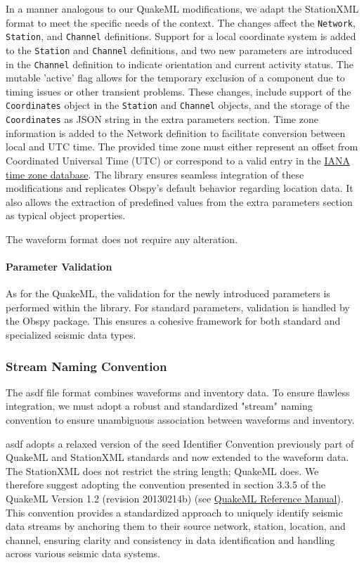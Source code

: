 In a manner analogous to our QuakeML modifications, we adapt the StationXML format to meet the specific needs of the \museismic context. The changes affect the \texttt{Network}, \texttt{Station}, and \texttt{Channel} definitions. Support for a local coordinate system is added to the \texttt{Station} and \texttt{Channel} definitions, and two new parameters are introduced in the \texttt{Channel} definition to indicate orientation and current activity status. The mutable 'active' flag allows for the temporary exclusion of a component due to timing issues or other transient problems. These changes, include support of the \texttt{Coordinates} object in the \texttt{Station} and \texttt{Channel} objects, and the storage of the \texttt{Coordinates} as JSON string in the extra parameters section. Time zone information is added to the Network definition to facilitate conversion between local and UTC time. The provided time zone must either represent an offset from Coordinated Universal Time (UTC) or correspond to a valid entry in the \href{https://www.iana.org/time-zones}{IANA time zone database}. The \muquake library ensures seamless integration of these modifications and replicates Obspy's default behavior regarding location data. It also allows the extraction of predefined values from the extra parameters section as typical object properties.

The waveform format does not require any alteration.

\paragraph{Parameter Validation}
As for the QuakeML, the validation for the newly introduced parameters is performed within the \muquake library. For standard parameters, validation is handled by the Obspy package. This ensures a cohesive framework for both standard and specialized seismic data types.

\subsubsection{Stream Naming Convention}

The \gls{asdf} file format combines waveforms and inventory data. To ensure flawless integration, we must adopt a robust and standardized "stream" naming convention to ensure unambiguous association between waveforms and inventory. 

\gls{asdf} adopts a relaxed version of the \gls{seed} Identifier Convention previously part of QuakeML and StationXML standards and now extended to the waveform data. The StationXML does not restrict the string length; QuakeML does. We therefore suggest adopting the convention presented in section 3.3.5 of the QuakeML Version 1.2 (revision 20130214b) (see \href{https://quake.ethz.ch/quakeml/docs/latest?action=AttachFile&do=get&target=QuakeML-BED.pdf}{QuakeML Reference Manual}). This convention provides a standardized approach to uniquely identify seismic data streams by anchoring them to their source network, station, location, and channel, ensuring clarity and consistency in data identification and handling across various seismic data systems.

